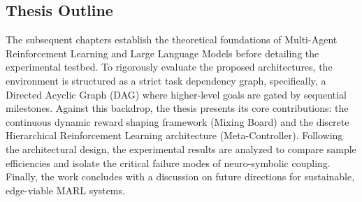 \subsection{Thesis Outline}
\label{sec:outline}

The subsequent chapters establish the theoretical foundations of Multi-Agent Reinforcement Learning and Large Language Models before detailing the experimental testbed. To rigorously evaluate the proposed architectures, the environment is structured as a strict task dependency graph, specifically, a Directed Acyclic Graph (DAG) where higher-level goals are gated by sequential milestones. Against this backdrop, the thesis presents its core contributions: the continuous dynamic reward shaping framework (Mixing Board) and the discrete Hierarchical Reinforcement Learning architecture (Meta-Controller). Following the architectural design, the experimental results are analyzed to compare sample efficiencies and isolate the critical failure modes of neuro-symbolic coupling. Finally, the work concludes with a discussion on future directions for sustainable, edge-viable MARL systems.
